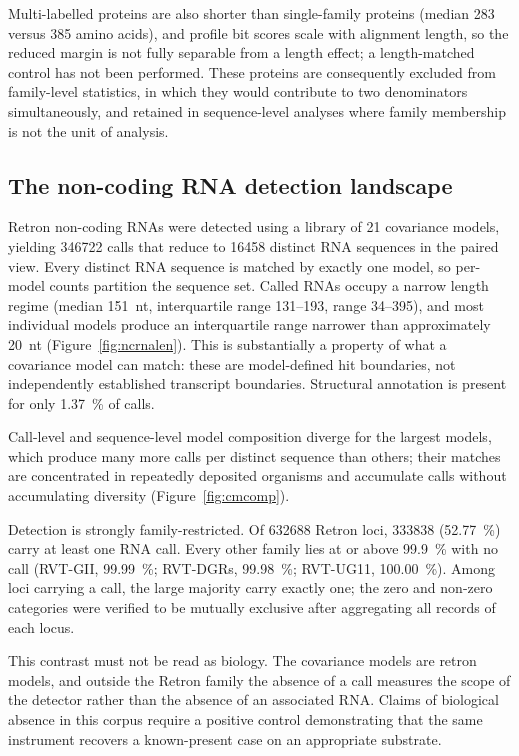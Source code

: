 Multi-labelled proteins are also shorter than single-family proteins (median 283 versus 385 amino
acids), and profile bit scores scale with alignment length, so the reduced margin is not fully
separable from a length effect; a length-matched control has not been performed. These proteins are
consequently excluded from family-level statistics, in which they would contribute to two
denominators simultaneously, and retained in sequence-level analyses where family membership is not
the unit of analysis.

\subsection{The non-coding RNA detection landscape}
\label{sec:dbchar:ncrna}

Retron non-coding RNAs were detected using a library of 21 covariance models, yielding \num{346722}
calls that reduce to \num{16458} distinct RNA sequences in the paired view. Every distinct RNA
sequence is matched by exactly one model, so per-model counts partition the sequence set. Called
RNAs occupy a narrow length regime (median 151~nt, interquartile range 131--193, range 34--395), and
most individual models produce an interquartile range narrower than approximately 20~nt
(Figure~\ref{fig:ncrnalen}). This is substantially a property of what a covariance model can match:
these are model-defined hit boundaries, not independently established transcript boundaries.
Structural annotation is present for only \SI{1.37}{\percent} of calls.

Call-level and sequence-level model composition diverge for the largest models, which produce many
more calls per distinct sequence than others; their matches are concentrated in repeatedly deposited
organisms and accumulate calls without accumulating diversity (Figure~\ref{fig:cmcomp}).

Detection is strongly family-restricted. Of \num{632688} Retron loci, \num{333838}
(\SI{52.77}{\percent}) carry at least one RNA call. Every other family lies at or above
\SI{99.9}{\percent} with no call (RVT-GII, \SI{99.99}{\percent}; RVT-DGRs, \SI{99.98}{\percent};
RVT-UG11, \SI{100.00}{\percent}). Among loci carrying a call, the large majority carry exactly one;
the zero and non-zero categories were verified to be mutually exclusive after aggregating all
records of each locus.

This contrast must not be read as biology. The covariance models are retron models, and outside the
Retron family the absence of a call measures the scope of the detector rather than the absence of an
associated RNA. Claims of biological absence in this corpus require a positive control demonstrating
that the same instrument recovers a known-present case on an appropriate substrate.

